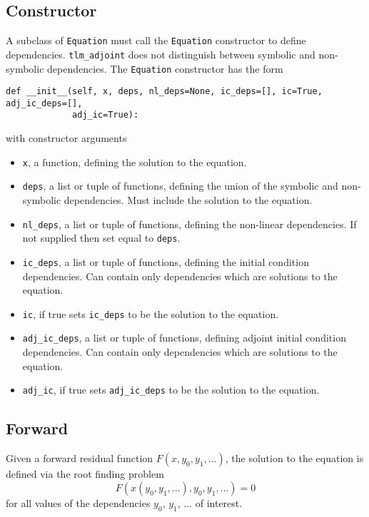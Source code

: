 \documentclass[11pt]{article}
\begin{document}
\subsection{Constructor}

A subclass of \texttt{Equation} must call the \texttt{Equation} constructor to
define dependencies. \texttt{tlm\_adjoint} does not distinguish between
symbolic and non-symbolic dependencies. The \texttt{Equation} constructor has
the form
\begin{lstlisting}
def __init__(self, x, deps, nl_deps=None, ic_deps=[], ic=True, adj_ic_deps=[],
             adj_ic=True):
\end{lstlisting}
with constructor arguments
\begin{itemize}
  \item \texttt{x}, a function, defining the solution to the equation.
  \item \texttt{deps}, a list or tuple of functions, defining the union of the
    symbolic and non-symbolic dependencies. Must include the solution to the
    equation.
  \item \texttt{nl\_deps}, a list or tuple of functions, defining the
    non-linear dependencies. If not supplied then set equal to \texttt{deps}.
  \item \texttt{ic\_deps}, a list or tuple of functions, defining the initial
    condition dependencies. Can contain only dependencies which are solutions
    to the equation.
  \item \texttt{ic}, if true sets \texttt{ic\_deps} to be the solution to the
    equation.
  \item \texttt{adj\_ic\_deps}, a list or tuple of functions, defining adjoint
    initial condition dependencies. Can contain only dependencies which are
    solutions to the equation.
  \item \texttt{adj\_ic}, if true sets \texttt{adj\_ic\_deps} to be the
    solution to the equation.
\end{itemize}

\subsection{Forward}

Given a forward residual function $F \left( x, y_0, y_1, \ldots \right)$, the
solution to the equation is defined via the root finding problem
\begin{equation*}
  F \left( \hat{x} \left( y_0, y_1, \ldots \right), y_0, y_1, \ldots \right)
    = 0
\end{equation*}
for all values of the dependencies $y_0$, $y_1$, $\ldots$ of interest.
\end{document}
